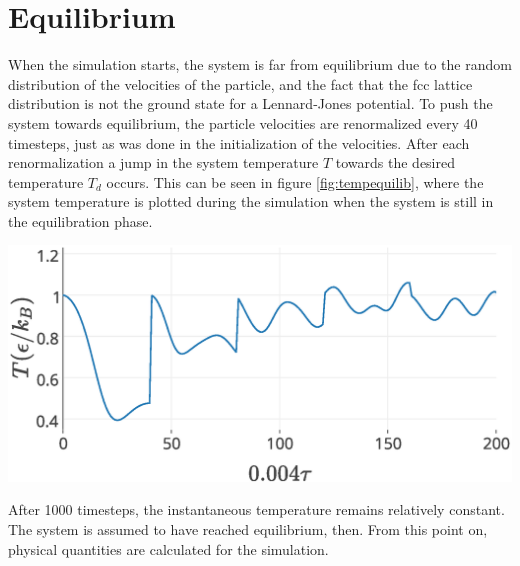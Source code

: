 \section{Equilibrium}
When the simulation starts, the system is far from equilibrium due to the random distribution of the velocities of the particle, and the fact that the fcc lattice distribution is not the ground state for a Lennard-Jones potential\cite{travesset2014phase}\cite{van1991can}. To push the system towards equilibrium, the particle velocities are renormalized every 40 timesteps, just as was done in the initialization of the velocities. After each renormalization a jump in the system temperature $T$ towards the desired temperature $T_d$ occurs. This can be seen in figure \ref{fig:tempequilib}, where the system temperature is plotted during the simulation when the system is still in the equilibration phase. 
\begin{Figure}
 \centering
 \includegraphics[width=1\linewidth]{equilibration.eps}
 \label{fig:tempequilib}
\end{Figure}

After 1000 timesteps, the instantaneous temperature remains relatively constant. The system is assumed to have reached equilibrium, then. From this point on, physical quantities are calculated for the simulation.
